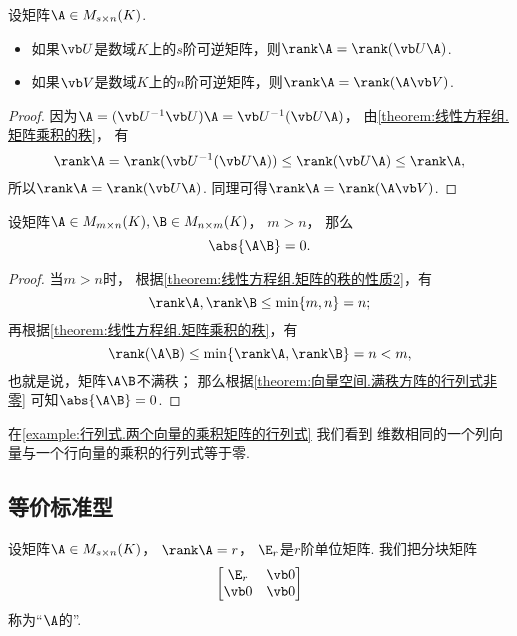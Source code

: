 \begin{corollary}\label{theorem:矩阵乘积的秩.与可逆矩阵相乘不变秩}
设矩阵\(\A \in M_{s \times n}(K)\).
\begin{itemize}
	\item 如果\(\P\)是数域\(K\)上的\(s\)阶可逆矩阵，则\(\rank\A = \rank(\P\A)\).
	\item 如果\(\Q\)是数域\(K\)上的\(n\)阶可逆矩阵，则\(\rank\A = \rank(\A\Q)\).
\end{itemize}
\begin{proof}
因为\(\A = (\P^{-1} \P) \A = \P^{-1} (\P \A)\)，
由\cref{theorem:线性方程组.矩阵乘积的秩}，
有\[
	\rank\A = \rank(\P^{-1}(\P\A)) \leq \rank(\P\A) \leq \rank\A,
\]
所以\(\rank\A = \rank(\P\A)\).
同理可得\(\rank\A = \rank(\A\Q)\).
\end{proof}
\end{corollary}

\begin{theorem}\label{theorem:矩阵乘积的秩.多行少列矩阵与少行多列矩阵的乘积的行列式}
设矩阵\(\A \in M_{m \times n}(K),
\B \in M_{n \times m}(K)\)，
\(m > n\)，
那么\[
	\abs{\A \B} = 0.
\]
\begin{proof}
当\(m>n\)时，
根据\cref{theorem:线性方程组.矩阵的秩的性质2}，有\[
	\rank\A,\rank\B \leq \min\{m,n\} = n;
\]
再根据\cref{theorem:线性方程组.矩阵乘积的秩}，有\[
	\rank(\A \B) \leq \min\{\rank\A,\rank\B\} = n < m,
\]
也就是说，矩阵\(\A \B\)不满秩；
那么根据\cref{theorem:向量空间.满秩方阵的行列式非零} 可知\(\abs{\A \B} = 0\).
\end{proof}
\end{theorem}
\begin{remark}
在\cref{example:行列式.两个向量的乘积矩阵的行列式} 我们看到
维数相同的一个列向量与一个行向量的乘积的行列式等于零.
\end{remark}

\subsection{等价标准型}
\begin{definition}
设矩阵\(\A \in M_{s \times n}(K)\)，
\(\rank\A = r\)，
\(\E_r\)是\(r\)阶单位矩阵.
我们把分块矩阵\[
	\begin{bmatrix}
		\E_r & \vb0 \\
		\vb0 & \vb0
	\end{bmatrix}
\]
称为“\(\A\)的”.
\end{definition}

